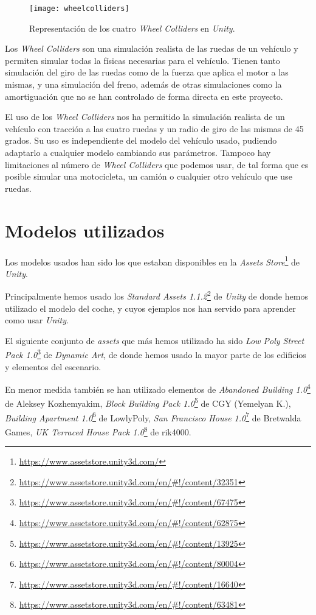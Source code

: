 \begin{figure}[htpb]
    \centering
    \texttt{[image: wheelcolliders]}
    \caption[Representación de los \textit{Wheel Colliders} en \textit{Unity}]{Representación de los cuatro \textit{Wheel Colliders} en \textit{Unity}.}
    \label{fig:basics AFM sketch}
\end{figure}

Los \textit{Wheel Colliders} son una simulación realista de las ruedas de un vehículo y permiten simular todas la físicas necesarias para el vehículo. Tienen tanto simulación del giro de las ruedas como de la fuerza que aplica el motor a las mismas, y una simulación del freno, además de otras simulaciones como la amortiguación que no se han controlado de forma directa en este proyecto.

El uso de los \textit{Wheel Colliders} nos ha permitido la simulación realista de un vehículo con tracción a las cuatro ruedas y un radio de giro de las mismas de 45 grados. Su uso es independiente del modelo del vehículo usado, pudiendo adaptarlo a cualquier modelo cambiando sus parámetros. Tampoco hay limitaciones al número de \textit{Wheel Colliders} que podemos usar, de tal forma que es posible simular una motocicleta, un camión o cualquier otro vehículo que use ruedas.

\section{Modelos utilizados}
Los modelos usados han sido los que estaban disponibles en la \textit{Assets Store}\footnote{\url{https://www.assetstore.unity3d.com/}} de \textit{Unity}.

Principalmente hemos usado los \textit{Standard Assets 1.1.2}\footnote{\url{https://www.assetstore.unity3d.com/en/\#!/content/32351}} de \textit{Unity} de donde hemos utilizado el modelo del coche, y cuyos ejemplos nos han servido para aprender como usar \textit{Unity}.

El siguiente conjunto de \textit{assets} que más hemos utilizado ha sido \textit{Low Poly Street Pack 1.0}\footnote{\url{https://www.assetstore.unity3d.com/en/\#!/content/67475}} de \textit{Dynamic Art}, de donde hemos usado la mayor parte de los edificios y elementos del escenario.

En menor medida también se han utilizado elementos de \textit{Abandoned Building 1.0}\footnote{\url{https://www.assetstore.unity3d.com/en/\#!/content/62875}} de Aleksey Kozhemyakim, \textit{Block Building Pack 1.0}\footnote{\url{https://www.assetstore.unity3d.com/en/\#!/content/13925}} de CGY (Yemelyan K.), \textit{Building Apartment 1.0}\footnote{\url{https://www.assetstore.unity3d.com/en/\#!/content/80004}} de LowlyPoly, \textit{San Francisco House 1.0}\footnote{\url{https://www.assetstore.unity3d.com/en/\#!/content/16640}} de Bretwalda Games, \textit{UK Terraced House Pack 1.0}\footnote{\url{https://www.assetstore.unity3d.com/en/\#!/content/63481}} de rik4000.

